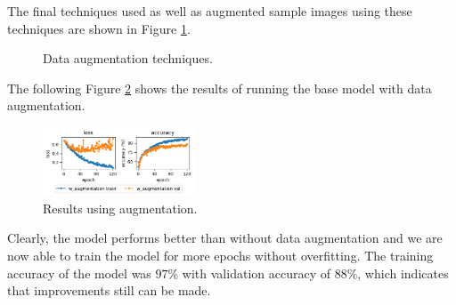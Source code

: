The final techniques used as well as augmented sample images using these techniques are shown in Figure \ref{fig:augmentation}.
\begin{figure}[H]
    \vspace*{-0.7cm}
    \centering
    \hspace{0.4cm}
    \caption{Data augmentation techniques.}
    \label{fig:augmentation}
    \vspace*{-0.7cm}
\end{figure}

The following Figure \ref{fig:augmentation_results} shows the results of running the base model with data augmentation.
\begin{figure}[H]
    \vspace*{-0.7cm}
    \centering
    \includegraphics[width=0.4\textwidth]{figures/results_augmentation.png}
    \caption{Results using augmentation.}
    \label{fig:augmentation_results}
    \vspace*{-0.7cm}
\end{figure}
Clearly, the model performs better than without data augmentation and we are now able to train the model for more epochs without overfitting. The training accuracy of the model was $97\%$ with validation accuracy of $88\%$, which indicates that improvements still can be made.

